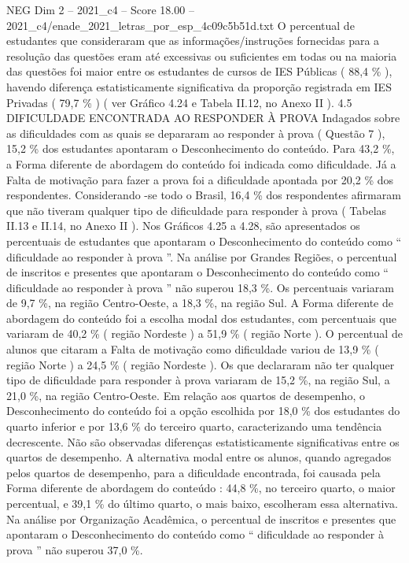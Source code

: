 \begin{textsample}{NEG Dim 2 – 2021\_c4 – Score 18.00 – 2021\_c4/enade\_2021\_letras\_por\_esp\_4c09c5b51d.txt}
O percentual de estudantes que consideraram que as informações/instruções fornecidas para a resolução das questões eram até excessivas ou suficientes em todas ou na maioria das questões foi maior entre os estudantes de cursos de IES Públicas ( 88,4 \% ), havendo diferença estatisticamente significativa da proporção registrada em IES Privadas ( 79,7 \% ) ( ver Gráfico 4.24 e Tabela II.12, no Anexo II ). 4.5 DIFICULDADE ENCONTRADA AO RESPONDER À PROVA Indagados sobre as dificuldades com as quais se depararam ao responder à prova ( Questão 7 ), 15,2 \% dos estudantes apontaram o Desconhecimento do conteúdo.
Para 43,2 \%, a Forma diferente de abordagem do conteúdo foi indicada como dificuldade.
Já a Falta de motivação para fazer a prova foi a dificuldade apontada por 20,2 \% dos respondentes.
Considerando -se todo o Brasil, 16,4 \% dos respondentes afirmaram que não tiveram qualquer tipo de dificuldade para responder à prova ( Tabelas II.13 e II.14, no Anexo II ).
Nos Gráficos 4.25 a 4.28, são apresentados os percentuais de estudantes que apontaram o Desconhecimento do conteúdo como “ dificuldade ao responder à prova ”.
Na análise por Grandes Regiões, o percentual de inscritos e presentes que apontaram o Desconhecimento do conteúdo como “ dificuldade ao responder à prova ” não superou 18,3 \%.
Os percentuais variaram de 9,7 \%, na região Centro-Oeste, a 18,3 \%, na região Sul.
A Forma diferente de abordagem do conteúdo foi a escolha modal dos estudantes, com percentuais que variaram de 40,2 \% ( região Nordeste ) a 51,9 \% ( região Norte ).
O percentual de alunos que citaram a Falta de motivação como dificuldade variou de 13,9 \% ( região Norte ) a 24,5 \% ( região Nordeste ).
Os que declararam não ter qualquer tipo de dificuldade para responder à prova variaram de 15,2 \%, na região Sul, a 21,0 \%, na região Centro-Oeste.
Em relação aos quartos de desempenho, o Desconhecimento do conteúdo foi a opção escolhida por 18,0 \% dos estudantes do quarto inferior e por 13,6 \% do terceiro quarto, caracterizando uma tendência decrescente.
Não são observadas diferenças estatisticamente significativas entre os quartos de desempenho.
A alternativa modal entre os alunos, quando agregados pelos quartos de desempenho, para a dificuldade encontrada, foi causada pela Forma diferente de abordagem do conteúdo : 44,8 \%, no terceiro quarto, o maior percentual, e 39,1 \% do último quarto, o mais baixo, escolheram essa alternativa.
Na análise por Organização Acadêmica, o percentual de inscritos e presentes que apontaram o Desconhecimento do conteúdo como “ dificuldade ao responder à prova ” não superou 37,0 \%.

\end{textsample}
